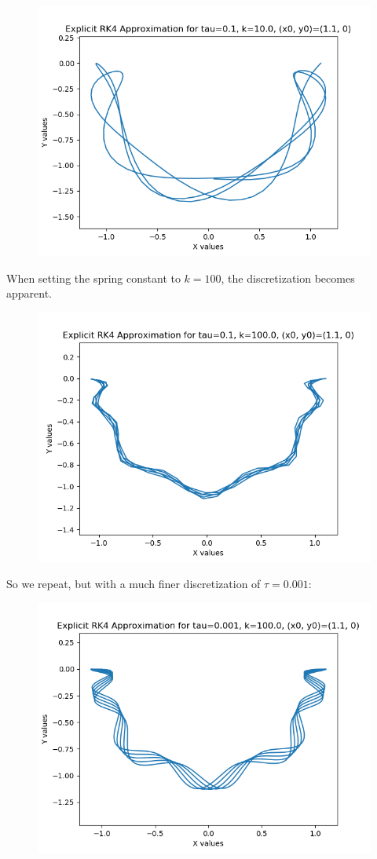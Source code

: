 \documentclass{article}
\theoremstyle{definition}
\begin{document}
\begin{itemize}
\begin{figure}[H]
			\includegraphics[scale=0.6]{erk4_spring_01_10}
		\end{figure}
		When setting the spring constant to $k=100$, the
		discretization becomes apparent.
		\begin{figure}[H]
			\includegraphics[scale=0.6]{erk4_spring_01_100}
		\end{figure}
		So we repeat, but with a much finer discretization of
		$\tau=0.001$:
		\begin{figure}[H]
			\includegraphics[scale=0.6]{erk4_spring_0001_100}

\end{figure}
\end{itemize}
\end{document}
